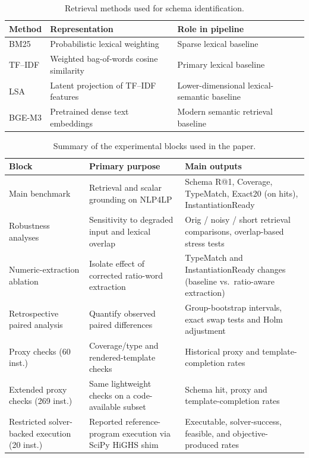 \documentclass[pdflatex,sn-basic,Numbered]{sn-jnl}
\begin{document}
\begin{table}[htbp]
\centering
\caption{Retrieval methods used for schema identification.}
\label{tab:retrieval_backbones}
\small
\begin{tabularx}{\linewidth}{l l X}
\toprule
Method & Representation & Role in pipeline \\
\midrule
BM25 & Probabilistic lexical weighting & Sparse lexical baseline \\
TF--IDF & Weighted bag-of-words cosine similarity & Primary lexical baseline \\
LSA & Latent projection of TF--IDF features & Lower-dimensional lexical-semantic baseline \\
BGE-M3 & Pretrained dense text embeddings & Modern semantic retrieval baseline \\
\bottomrule
\end{tabularx}
\end{table}
\begin{table}[htbp]
\centering
\caption{Summary of the experimental blocks used in the paper.}
\label{tab:exp_blocks}
\small
\begin{tabularx}{\linewidth}{X X X}
\toprule
Block & Primary purpose & Main outputs \\
\midrule
Main benchmark & Retrieval and scalar grounding on \textsc{NLP4LP} & Schema R@1, Coverage, TypeMatch, Exact20 (on hits), InstantiationReady \\
Robustness analyses & Sensitivity to degraded input and lexical overlap & Orig / noisy / short retrieval comparisons, overlap-based stress tests \\
Numeric-extraction ablation & Isolate effect of corrected ratio-word extraction & TypeMatch and InstantiationReady changes (baseline vs.\ ratio-aware extraction) \\
Retrospective paired analysis & Quantify observed paired differences & Group-bootstrap intervals, exact swap tests and Holm adjustment \\
Proxy checks (60 inst.) & Coverage/type and rendered-template checks & Historical proxy and template-completion rates \\
Extended proxy checks (269 inst.) & Same lightweight checks on a code-available subset & Schema hit, proxy and template-completion rates \\
Restricted solver-backed execution (20 inst.) & Reported reference-program execution via SciPy HiGHS shim & Executable, solver-success, feasible, and objective-produced rates \\
\bottomrule
\end{tabularx}
\end{table}
\FloatBarrier
\end{document}
